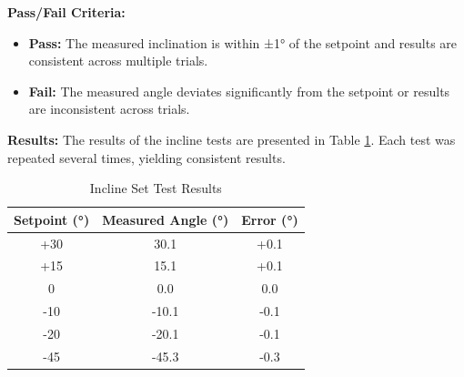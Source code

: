 \textbf{Pass/Fail Criteria:}
\begin{itemize}
    \item \textbf{Pass:} The measured inclination is within ±1° of the setpoint and results are consistent across multiple trials.
    \item \textbf{Fail:} The measured angle deviates significantly from the setpoint or results are inconsistent across trials.
\end{itemize}

\textbf{Results:}
The results of the incline tests are presented in Table \ref{tab:incline_test}. Each test was repeated several times, yielding consistent results.

\begin{table}[H]
\centering
\caption{Incline Set Test Results}
\label{tab:incline_test}
\begin{tabular}{|c|c|c|}
\hline
\textbf{Setpoint (°)} & \textbf{Measured Angle (°)} & \textbf{Error (°)} \\ \hline
+30                  & 30.1                       & +0.1               \\ \hline
+15                  & 15.1                       & +0.1               \\ \hline
0                    & 0.0                        & 0.0                \\ \hline
-10                  & -10.1                      & -0.1               \\ \hline
-20                  & -20.1                      & -0.1               \\ \hline
-45                  & -45.3                      & -0.3               \\ \hline
\end{tabular}
\end{table}

